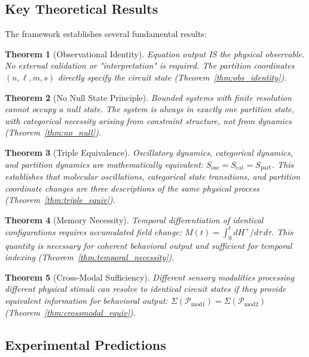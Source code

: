 \documentclass[aps,prd,twocolumn,superscriptaddress,floatfix,nofootinbib]{revtex4-2}
\newtheorem{theorem}{Theorem}[section]
\theoremstyle{remark}
\begin{document}
\subsection{Key Theoretical Results}

The framework establishes several fundamental results:

\begin{theorem}[Observational Identity]
Equation output IS the physical observable. No external validation or "interpretation" is required. The partition coordinates $(n, \ell, m, s)$ directly specify the circuit state (Theorem~\ref{thm:obs_identity}).
\end{theorem}

\begin{theorem}[No Null State Principle]
Bounded systems with finite resolution cannot occupy a null state. The system is always in exactly one partition state, with categorical necessity arising from constraint structure, not from dynamics (Theorem~\ref{thm:no_null}).
\end{theorem}

\begin{theorem}[Triple Equivalence]
Oscillatory dynamics, categorical dynamics, and partition dynamics are mathematically equivalent: $S_{\text{osc}} = S_{\text{cat}} = S_{\text{part}}$. This establishes that molecular oscillations, categorical state transitions, and partition coordinate changes are three descriptions of the same physical process (Theorem~\ref{thm:triple_equiv}).
\end{theorem}

\begin{theorem}[Memory Necessity]
Temporal differentiation of identical configurations requires accumulated field change: $M(t) = \int_0^t dH^+/d\tau \, d\tau$. This quantity is necessary for coherent behavioral output and sufficient for temporal indexing (Theorem~\ref{thm:temporal_necessity}).
\end{theorem}

\begin{theorem}[Cross-Modal Sufficiency]
Different sensory modalities processing different physical stimuli can resolve to identical circuit states if they provide equivalent information for behavioral output: $\Sigma(\mathcal{P}_{\text{mod1}}) = \Sigma(\mathcal{P}_{\text{mod2}})$ (Theorem~\ref{thm:crossmodal_equiv}).
\end{theorem}

\subsection{Experimental Predictions}
\end{document}
